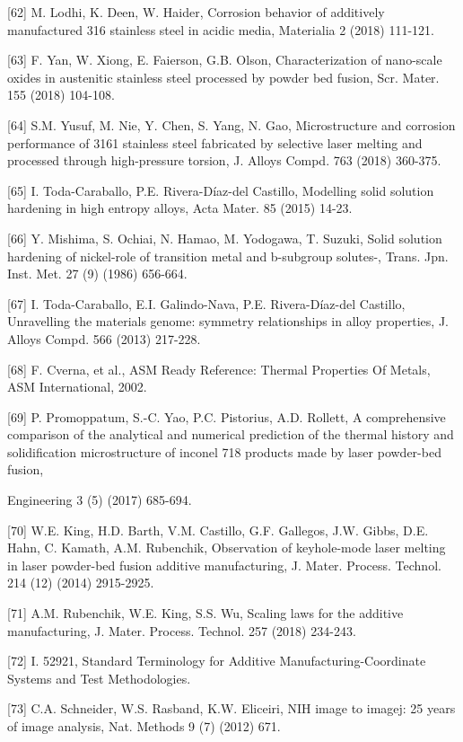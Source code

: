 \documentclass[10pt]{article}
\begin{document}
[62] M. Lodhi, K. Deen, W. Haider, Corrosion behavior of additively manufactured 316 stainless steel in acidic media, Materialia 2 (2018) 111-121.

[63] F. Yan, W. Xiong, E. Faierson, G.B. Olson, Characterization of nano-scale oxides in austenitic stainless steel processed by powder bed fusion, Scr. Mater. 155 (2018) 104-108.

[64] S.M. Yusuf, M. Nie, Y. Chen, S. Yang, N. Gao, Microstructure and corrosion performance of 3161 stainless steel fabricated by selective laser melting and processed through high-pressure torsion, J. Alloys Compd. 763 (2018) 360-375.

[65] I. Toda-Caraballo, P.E. Rivera-Díaz-del Castillo, Modelling solid solution hardening in high entropy alloys, Acta Mater. 85 (2015) 14-23.

[66] Y. Mishima, S. Ochiai, N. Hamao, M. Yodogawa, T. Suzuki, Solid solution hardening of nickel-role of transition metal and b-subgroup solutes-, Trans. Jpn. Inst. Met. 27 (9) (1986) 656-664.

[67] I. Toda-Caraballo, E.I. Galindo-Nava, P.E. Rivera-Díaz-del Castillo, Unravelling the materials genome: symmetry relationships in alloy properties, J. Alloys Compd. 566 (2013) 217-228.

[68] F. Cverna, et al., ASM Ready Reference: Thermal Properties Of Metals, ASM International, 2002.

[69] P. Promoppatum, S.-C. Yao, P.C. Pistorius, A.D. Rollett, A comprehensive comparison of the analytical and numerical prediction of the thermal history and solidification microstructure of inconel 718 products made by laser powder-bed fusion,

Engineering 3 (5) (2017) 685-694.

[70] W.E. King, H.D. Barth, V.M. Castillo, G.F. Gallegos, J.W. Gibbs, D.E. Hahn, C. Kamath, A.M. Rubenchik, Observation of keyhole-mode laser melting in laser powder-bed fusion additive manufacturing, J. Mater. Process. Technol. 214 (12) (2014) 2915-2925.

[71] A.M. Rubenchik, W.E. King, S.S. Wu, Scaling laws for the additive manufacturing, J. Mater. Process. Technol. 257 (2018) 234-243.

[72] I. 52921, Standard Terminology for Additive Manufacturing-Coordinate Systems and Test Methodologies.

[73] C.A. Schneider, W.S. Rasband, K.W. Eliceiri, NIH image to imagej: 25 years of image analysis, Nat. Methods 9 (7) (2012) 671.
\end{document}
